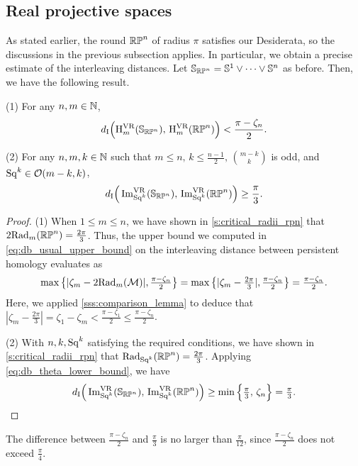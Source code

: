 \subsection{Real projective spaces}\label{ss:distance_estimate_rpn}

As stated earlier, the round \(\mathbb{RP}^n\) of radius \(\pi\) satisfies our Desiderata, so the discussions in the previous subsection applies.
In particular, we obtain a precise estimate of the interleaving distances. 
Let \(\mathbb{S}_{\mathbb{RP}^n} = \mathbb{S}^1 \vee \dots \vee \mathbb{S}^n\) as before.
Then, we have the following result.

\medskip\corollary
(1) For any \(n,m \in \mathbb{N}\),
\[
d_{\mathrm{I}}\Big(\mathrm{H}^{\mathrm{VR}}_m(\mathbb{S}_{\mathbb{RP}^n}),\, \mathrm{H}^{\mathrm{VR}}_m(\mathbb{RP}^n)\Big) < \frac{\pi - \zeta_n}{2}.
\]

\noindent (2) For any \(n,m,k \in \mathbb{N}\) such that $m \leq n,\, k \leq \tfrac{n-1}{2},\, \binom{m-k}{k}$ is odd, and $\mathrm{Sq}^k\in \mathcal{O}(m-k, k)$,
\[
d_{\mathrm{I}}\Big(\operatorname{Im}_{\mathrm{Sq}^k}^{\mathrm{VR}}(\mathbb{S}_{\mathbb{RP}^n}),\, \operatorname{Im}_{\mathrm{Sq}^k}^{\mathrm{VR}}(\mathbb{RP}^n)\Big) \geq \frac{\pi}{3}.
\]

\begin{proof}
    (1) %
    When $1 \leq m \leq n$, we have shown in \cref{s:critical_radii_rpn} that
    $2\mathrm{Rad}_{m}(\mathbb{RP}^n) = \tfrac{2\pi}{3}$.
    Thus, the upper bound we computed in \cref{eq:db_usual_upper_bound} on the interleaving distance between persistent homology evaluates as
    \[\max\big\{|\zeta_m  - 2\mathrm{Rad}_{m}(\mathcal{M}) |, \tfrac{\pi - \zeta_n}{2}\big\} =
    \max \big\{ |\zeta_m  - \tfrac{2\pi}{3} |, \tfrac{\pi - \zeta_n}{2} \big\}
    = \tfrac{\pi - \zeta_n}{2}.
    \]
    Here, we applied \cref{sss:comparison_lemma} to deduce that $|\zeta_m  - \tfrac{2\pi}{3} | = \zeta_1 - \zeta_m < \tfrac{\pi - \zeta_1}{2} \leq \tfrac{\pi - \zeta_n}{2}$.
 
    (2) With $n,k,\mathrm{Sq}^k$ satisfying the required conditions, we have shown in \cref{s:critical_radii_rpn} that
	$\mathrm{Rad}_{\mathrm{Sq}^k}(\mathbb{RP}^n) = \tfrac{2\pi}{3}$.
    Applying \cref{eq:db_theta_lower_bound}, we have
	\[d_{\mathrm{I}}\Big(\operatorname{Im}_{\mathrm{Sq}^k}^{\mathrm{VR}}(\mathbb{S}_{\mathbb{RP}^n}),\, \operatorname{Im}_{\mathrm{Sq}^k}^{\mathrm{VR}}(\mathbb{RP}^n)\Big)
	\geq \min\Big\{\tfrac{\pi}{3},\, \zeta_n\Big\}
	= \tfrac{\pi}{3}.\qedhere
    \]
\end{proof}

The difference between $\frac{\pi - \zeta_n}{2}$ and $\frac{\pi}{3}$ is no larger than $\frac{\pi}{12}$, since \(\tfrac{\pi - \zeta_n}{2}\) does not exceed \(\tfrac{\pi}{4}\).
